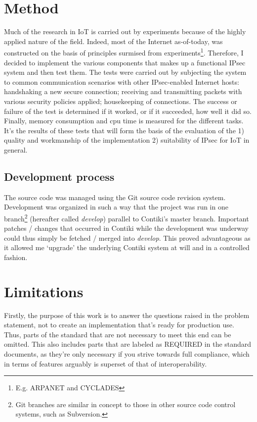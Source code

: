 \documentclass[final,a4paper,twoside,11pt,onecolumn]{report}
\begin{document}
\section{Method}
Much of the research in IoT is carried out by experiments because of the highly applied nature of the field. Indeed, most of the Internet as-of-today, was constructed on the basis of principles surmised from experiments\footnote{E.g. ARPANET and CYCLADES}. Therefore, I decided to implement the various components that makes up a functional IPsec system and then test them. The tests were carried out by subjecting the system to common communication scenarios with other IPsec-enabled Internet hosts: handshaking a new secure connection; receiving and transmitting packets with various security policies applied; housekeeping of connections. The success or failure of the test is determined if it worked, or if it succeeded, how well it did so. Finally, memory consumption and cpu time is measured for the different tasks. It's the results of these tests that will form the basis of the evaluation of the 1) quality and workmanship of the implementation 2) suitability of IPsec for IoT in general.

\subsection{Development process}
The source code was managed using the Git source code revision system. Development was organized in such a way that the project was run in one branch\footnote{Git branches are similar in concept to those in other source code control systems, such as Subversion.} (hereafter called \emph{develop}) parallel to Contiki's master branch. Important patches / changes that occurred in Contiki while the development was underway could thus simply be fetched / merged into \emph{develop}. This proved advantageous as it allowed me `upgrade' the underlying Contiki system at will and in a controlled fashion.

\section{Limitations}
Firstly, the purpose of this work is to answer the questions raised in the problem statement, not to create an implementation that's ready for production use. Thus, parts of the standard that are not necessary to meet this end can be omitted. This also includes parts that are labeled as REQUIRED in the standard documents, as they're only necessary if you strive towards full compliance, which in terms of features arguably is superset of that of interoperability.
\end{document}
